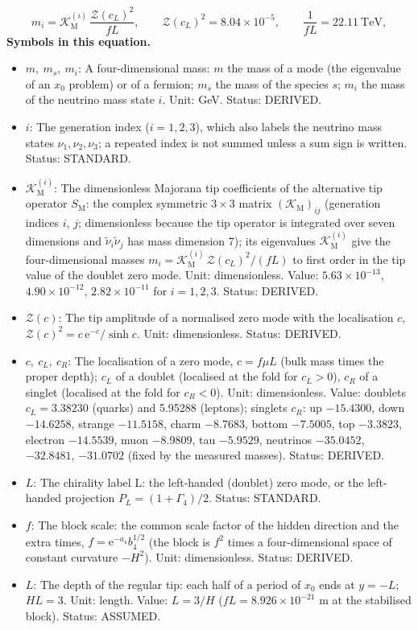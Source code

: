 \documentclass[
  10pt,
]{article}
\providecommand{\tightlist}{%
  \setlength{\itemsep}{0pt}\setlength{\parskip}{0pt}}
\begin{document}
\[ m_i = \mathcal{K}_{\mathrm{M}}^{(i)}\,\frac{\mathcal{Z}(c_L)^2}{fL},\qquad \mathcal{Z}(c_L)^2 = 8.04\times10^{-5},\qquad \frac{1}{fL} = 22.11\ \text{TeV}, \]
\textbf{Symbols in this equation.}

\begin{itemize}
\tightlist
\item
  \(m,\ m_s,\ m_i\): A four-dimensional mass: \(m\) the mass of a mode
  (the eigenvalue of an \(x_0\) problem) or of a fermion; \(m_s\) the
  mass of the species \(s\); \(m_i\) the mass of the neutrino mass state
  \(i\). Unit: GeV. Status: DERIVED.
\item
  \(i\): The generation index (\(i = 1, 2, 3\)), which also labels the
  neutrino mass states \(\nu_1, \nu_2, \nu_3\); a repeated index is not
  summed unless a sum sign is written. Status: STANDARD.
\item
  \(\mathcal{K}_{\mathrm{M}}^{(i)}\): The dimensionless Majorana tip
  coefficients of the alternative tip operator \(S_{\mathrm{M}}\): the
  complex symmetric \(3\times3\) matrix
  \((\mathcal{K}_{\mathrm{M}})_{ij}\) (generation indices \(i\), \(j\);
  dimensionless because the tip operator is integrated over seven
  dimensions and \(\tilde\nu_i\tilde\nu_j\) has mass dimension 7); its
  eigenvalues \(\mathcal{K}_{\mathrm{M}}^{(i)}\) give the
  four-dimensional masses
  \(m_i = \mathcal{K}_{\mathrm{M}}^{(i)}\,\mathcal{Z}(c_L)^2/(fL)\) to
  first order in the tip value of the doublet zero mode. Unit:
  dimensionless. Value: \(5.63\times10^{-13}\), \(4.90\times10^{-12}\),
  \(2.82\times10^{-11}\) for \(i = 1, 2, 3\). Status: DERIVED.
\item
  \(\mathcal{Z}(c)\): The tip amplitude of a normalised zero mode with
  the localisation \(c\),
  \(\mathcal{Z}(c)^2 = c\,\mathrm{e}^{-c}/\sinh c\). Unit:
  dimensionless. Status: DERIVED.
\item
  \(c,\ c_L,\ c_R\): The localisation of a zero mode, \(c = f\mu L\)
  (bulk mass times the proper depth); \(c_L\) of a doublet (localised at
  the fold for \(c_L > 0\)), \(c_R\) of a singlet (localised at the fold
  for \(c_R < 0\)). Unit: dimensionless. Value: doublets
  \(c_L = 3.38230\) (quarks) and 5.95288 (leptons); singlets \(c_R\): up
  \(-15.4300\), down \(-14.6258\), strange \(-11.5158\), charm
  \(-8.7683\), bottom \(-7.5005\), top \(-3.3823\), electron
  \(-14.5539\), muon \(-8.9809\), tau \(-5.9529\), neutrinos
  \(-35.0452\), \(-32.8481\), \(-31.0702\) (fixed by the measured
  masses). Status: DERIVED.
\item
  \(L\): The chirality label L: the left-handed (doublet) zero mode, or
  the left-handed projection \(P_L = (1 + \Gamma_4)/2\). Status:
  STANDARD.
\item
  \(f\): The block scale: the common scale factor of the hidden
  direction and the extra times, \(f = \mathrm{e}^{-a_4}b_4^{1/2}\) (the
  block is \(f^2\) times a four-dimensional space of constant curvature
  \(-H^2\)). Unit: dimensionless. Status: DERIVED.
\item
  \(L\): The depth of the regular tip: each half of a period of \(x_0\)
  ends at \(y = -L\); \(HL = 3\). Unit: length. Value: \(L = 3/H\)
  (\(fL = 8.926\times10^{-21}\) m at the stabilised block). Status:
  ASSUMED.
\end{itemize}
\end{document}
